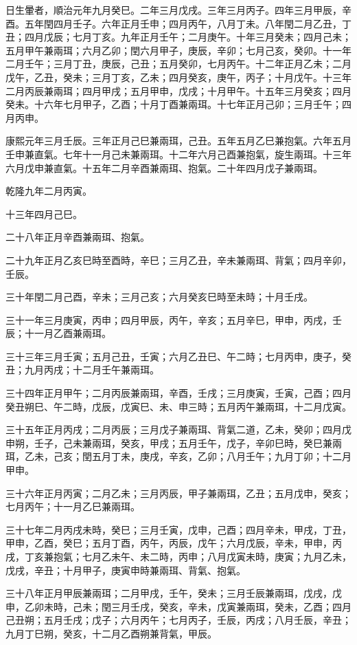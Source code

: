 \begin{pinyinscope}
日生暈者，順治元年九月癸巳。二年三月戊戌。三年三月丙子。四年三月甲辰，辛酉。五年閏四月壬子。六年正月壬申；四月丙午，八月丁未。八年閏二月乙丑，丁丑；四月戊辰；七月丁亥。九年正月壬午；二月庚午。十年三月癸未；四月己未；五月甲午兼兩珥；六月乙卯；閏六月甲子，庚辰，辛卯；七月己亥，癸卯。十一年二月壬午；三月丁丑，庚辰，己丑；五月癸卯，七月丙午。十二年正月乙未；二月戊午，乙丑，癸未；三月丁亥，乙未；四月癸亥，庚午，丙子；十月戊午。十三年二月丙辰兼兩珥；四月甲戌；五月甲申，戊戌；十月甲午。十五年三月癸亥；四月癸未。十六年七月甲子，乙酉；十月丁酉兼兩珥。十七年正月己卯；三月壬午；四月丙申。

康熙元年三月壬辰。三年正月己巳兼兩珥，己丑。五年五月乙巳兼抱氣。六年五月壬申兼直氣。七年十一月己未兼兩珥。十二年六月己酉兼抱氣，旋生兩珥。十三年六月戊申兼直氣。十五年二月辛酉兼兩珥、抱氣。二十年四月戊子兼兩珥。

乾隆九年二月丙寅。

十三年四月己巳。

二十八年正月辛酉兼兩珥、抱氣。

二十九年正月乙亥巳時至酉時，辛巳；三月乙丑，辛未兼兩珥、背氣；四月辛卯，壬辰。

三十年閏二月己酉，辛未；三月己亥；六月癸亥巳時至未時；十月壬戌。

三十一年三月庚寅，丙申；四月甲辰，丙午，辛亥；五月辛巳，甲申，丙戌，壬辰；十一月乙酉兼兩珥。

三十三年三月壬寅；五月己丑，壬寅；六月乙丑巳、午二時；七月丙申，庚子，癸丑；九月丙戌；十二月壬午兼兩珥。

三十四年正月甲午；二月丙辰兼兩珥，辛酉，壬戌；三月庚寅，壬寅，己酉；四月癸丑朔巳、午二時，戊辰，戊寅巳、未、申三時；五月丙午兼兩珥，十二月戊寅。

三十五年正月丙戌；二月丙辰；三月戊子兼兩珥、背氣二道，乙未，癸卯；四月戊申朔，壬子，己未兼兩珥，癸亥，甲戌；五月壬午，戊子，辛卯巳時，癸巳兼兩珥，乙未，己亥；閏五月丁未，庚戌，辛亥，乙卯；八月壬午；九月丁卯；十二月甲申。

三十六年正月丙寅；二月乙未；三月丙辰，甲子兼兩珥，乙丑；五月戊申，癸亥；七月丙午；十一月乙巳兼兩珥。

三十七年二月丙戌未時，癸巳；三月壬寅，戊申，己酉；四月辛未，甲戌，丁丑，甲申，乙酉，癸巳；五月丁酉，丙午，丙辰，戊午；六月戊辰，辛未，甲申，丙戌，丁亥兼抱氣；七月乙未午、未二時，丙申；八月戊寅未時，庚寅；九月乙未，戊戌，辛丑；十月甲子，庚寅申時兼兩珥、背氣、抱氣。

三十八年正月甲辰兼兩珥；二月甲戌，壬午，癸未；三月壬辰兼兩珥，戊戌，戊申，乙卯未時，己未；閏三月壬戌，癸亥，辛未，戊寅兼兩珥，癸未，乙酉；四月己丑朔；五月壬戌；戊子；六月丙午；七月丙子，壬辰，丙戌；八月壬辰，辛丑；九月丁巳朔，癸亥，十二月乙酉朔兼背氣，甲辰。


\end{pinyinscope}
